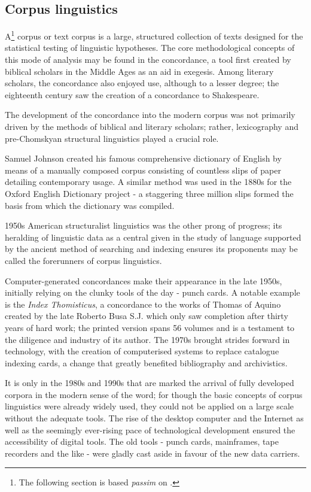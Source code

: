 \subsection{Corpus linguistics}
A\footnote{The following section is based \emph{passim} on
\citet{okeeffe2010}.} corpus or text corpus is a large, structured collection
of texts designed for the statistical testing of linguistic hypotheses. The
core methodological concepts of this mode of analysis may be found in the
concordance, a tool first created by biblical scholars in the Middle Ages as an
aid in exegesis. Among literary scholars, the concordance also enjoyed use,
although to a lesser degree; the eighteenth century saw the creation of a
concordance to Shakespeare.

 The development of the concordance into the modern corpus was not primarily
 driven by the methods of biblical and literary scholars; rather, lexicography
 and pre-Chomskyan structural linguistics played a crucial role.

 Samuel Johnson created his famous comprehensive dictionary of English by means
 of a manually composed corpus consisting of countless slips of paper detailing
 contemporary usage. A similar method was used in the 1880s for the Oxford
 English Dictionary project - a staggering three million slips formed the basis
 from which the dictionary was compiled.

 1950s American structuralist linguistics was the other prong of progress; its
 heralding of linguistic data as a central given in the study of language
 supported by the ancient method of searching and indexing ensures its
 proponents may be called the forerunners of corpus linguistics.

Computer-generated concordances make their appearance in the late 1950s,
initially relying on the clunky tools of the day - punch cards. A notable
example is the \emph{Index Thomisticus}, a concordance
to the works of Thomas of Aquino created by the late Roberto Busa S.J. which
only saw completion after thirty years of hard work; the printed version spans
56 volumes and is a testament to the diligence and industry of its author. The
1970s brought strides forward in technology, with the creation of computerised
systems to replace catalogue indexing cards, a change that greatly benefited
bibliography and archivistics.

 It is only in the 1980s and 1990s that are marked the arrival of fully
 developed corpora in the modern sense of the word; for though the basic
 concepts of corpus linguistics were already widely used, they could not be
 applied on a large scale without the adequate tools. The rise of the desktop
 computer and the Internet as well as the seemingly ever-rising pace of
 technological development ensured the accessibility of digital tools.  The old
 tools - punch cards, mainframes, tape recorders and the like - were gladly
 cast aside in favour of the new data carriers.

